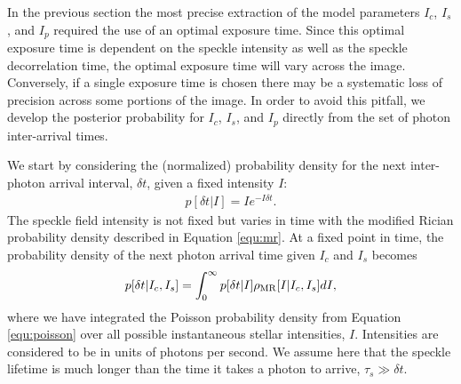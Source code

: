 \documentclass[../main.tex]{subfiles}
\begin{document}
In the previous section the most precise extraction of the model parameters $I_c$, $I_s$, and $I_p$ required the use of an optimal exposure time. Since this optimal exposure time is dependent on the speckle intensity as well as the speckle decorrelation time, the optimal exposure time will vary across the image. Conversely, if a single exposure time is chosen there may be a systematic loss of precision across some portions of the image. In order to avoid this pitfall, we develop the posterior probability for $I_c$, $I_s$, and $I_p$ directly from the set of photon inter-arrival times. 

We start by considering the (normalized) probability density for the next inter-photon arrival interval, $\delta t$, given a fixed intensity $I$:
\begin{equation}
\begin{aligned}
p[\delta t | I] = I e^{-I \delta t}.
\label{equ:poisson}
\end{aligned}
\end{equation}
The speckle field intensity is not fixed but varies in time with the modified Rician probability density described in Equation \eqref{equ:mr}. At a fixed point in time, the probability density of the next photon arrival time given $I_c$ and $I_s$ becomes
\begin{equation}
\begin{aligned}
p[\delta t | I_c, I_s] = \int_{0}^{\infty} p[\delta t | I] \rho_{\rm MR} [I | I_c, I_s] dI,
\end{aligned}
\end{equation}
where we have integrated the Poisson probability density from Equation \eqref{equ:poisson} over all possible instantaneous stellar intensities, $I$. Intensities are considered to be in units of photons per second. We assume here that the speckle lifetime is much longer than the time it takes a photon to arrive, $\tau_s \gg \delta t$. 
\end{document}
